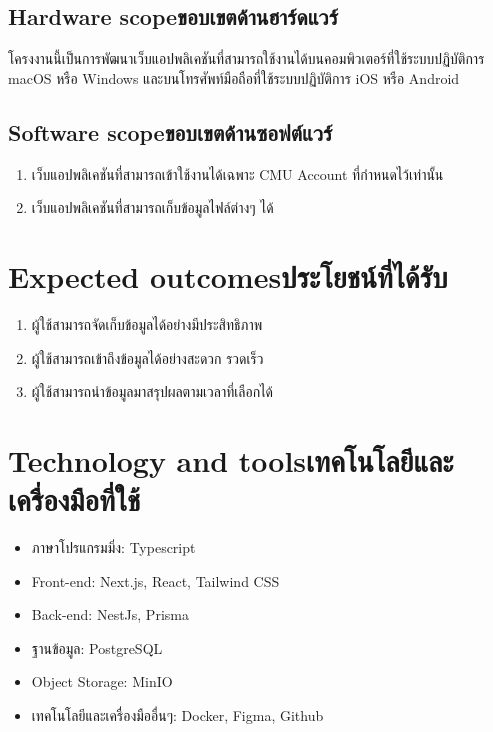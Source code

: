 \subsection{\ifenglish Hardware scope\else ขอบเขตด้านฮาร์ดแวร์\fi}
โครงงานนี้เป็นการพัฒนาเว็บแอปพลิเคชันที่สามารถใช้งานได้บนคอมพิวเตอร์ที่ใช้ระบบปฏิบัติการ macOS
หรือ Windows และบนโทรศัพท์มือถือที่ใช้ระบบปฏิบัติการ iOS หรือ Android
\subsection{\ifenglish Software scope\else ขอบเขตด้านซอฟต์แวร์\fi}
\begin{enumerate}
    \item เว็บแอปพลิเคชันที่สามารถเข้าใช้งานได้เฉพาะ CMU Account ที่กำหนดไว้เท่านั้น
    \item เว็บแอปพลิเคชันที่สามารถเก็บข้อมูลไฟล์ต่างๆ ได้
\end{enumerate}
\section{\ifenglish Expected outcomes\else ประโยชน์ที่ได้รับ\fi}
\begin{enumerate}
    \item ผู้ใช้สามารถจัดเก็บข้อมูลได้อย่างมีประสิทธิภาพ
    \item ผู้ใช้สามารถเข้าถึงข้อมูลได้อย่างสะดวก รวดเร็ว
    \item ผู้ใช้สามารถนำข้อมูลมาสรุปผลตามเวลาที่เลือกได้
\end{enumerate}
\section{\ifenglish Technology and tools\else เทคโนโลยีและเครื่องมือที่ใช้\fi}
\begin{itemize}
    \item ภาษาโปรแกรมมิ่ง: Typescript
    \item Front-end: Next.js, React, Tailwind CSS
    \item Back-end: NestJs, Prisma
    \item ฐานข้อมูล: PostgreSQL
    \item Object Storage: MinIO
    \item เทคโนโลยีและเครื่องมืออื่นๆ: Docker, Figma, Github
\end{itemize}    

